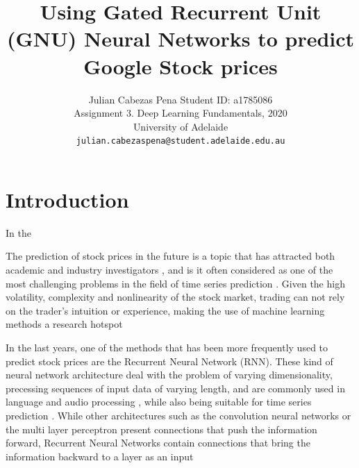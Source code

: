 \documentclass[10pt,twocolumn,letterpaper]{article}
\begin{document}
\title{Using Gated Recurrent Unit (GNU) Neural Networks to predict Google Stock prices}

\author{Julian Cabezas Pena Student ID: a1785086\\
Assignment 3. Deep Learning Fundamentals, 2020 \\
University of Adelaide\\
{\tt\small julian.cabezaspena@student.adelaide.edu.au}
}

\maketitle

\begin{abstract}
	


\end{abstract}

\section{Introduction}

In the

The prediction of stock prices in the future is a topic that has attracted both academic and industry investigators \cite{Zhao2020}, and is it often considered as one of the most challenging problems in the field of time series prediction \cite{Kara2011}. Given the high volatility, complexity and nonlinearity of the stock market, trading can not rely on the trader's intuition or experience, making the use of machine learning methods a research hotspot \cite{Qiu2020}

In the last years, one of the methods that has been more frequently used to predict stock prices are the Recurrent Neural Network (RNN). These kind of neural network architecture deal with the problem of varying dimensionality, precessing sequences of input data of varying length, and are commonly used in language and audio processing \cite{Skansi2018}, while also being suitable for time series prediction \cite{Zhao2020}. While other architectures such as the convolution neural networks or the multi layer perceptron present connections that push the information forward, Recurrent Neural Networks contain connections that bring the information backward to a layer as an input \cite{Skansi2018}
\end{document}
